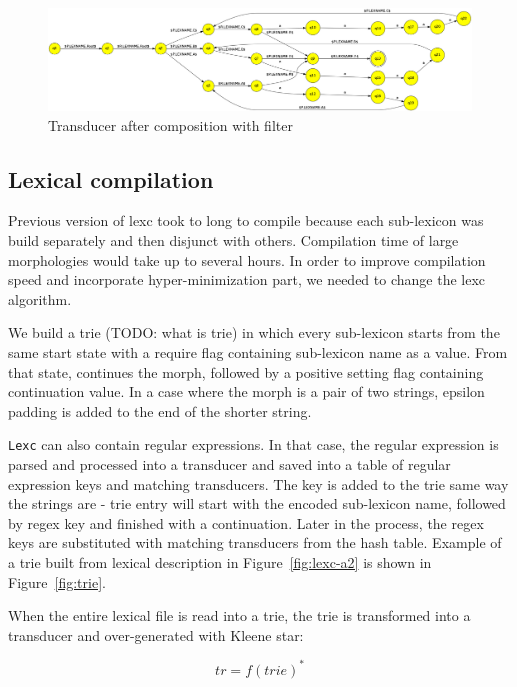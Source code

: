 \documentclass[11pt]{article}
\begin{document}
\begin{figure}
    \includegraphics[width=\textwidth]{after_comp.png}
     \caption{Transducer after composition with filter
     \label{fig:after}}
\end{figure}



\subsection{Lexical compilation}

Previous version of lexc took to long to compile because each sub-lexicon was build separately and then disjunct with others. Compilation time of large morphologies would take up to several hours. In order to improve compilation speed and incorporate hyper-minimization part, we needed to change the lexc algorithm.

We build a trie (TODO: what is trie) in which every sub-lexicon starts from the same start state with a require flag containing sub-lexicon name as a value. From that state, continues the morph, followed by a positive setting flag containing continuation value. In a case where the morph is a pair of two strings, epsilon padding is added to the end of the shorter string.

\texttt{Lexc} can also contain regular expressions. In that case, the regular expression is parsed and processed into a transducer and saved into a table of regular expression keys and matching transducers. The key is added to the trie same way the strings are - trie entry will start with the encoded sub-lexicon name, followed by regex key and finished with a continuation. Later in the process, the regex keys are substituted with matching transducers from the hash table. Example of a trie built from lexical description in Figure~\ref{fig:lexc-a2} is shown in Figure~\ref{fig:trie}.


When the entire lexical file is read into a trie, the trie is transformed into a transducer and over-generated with Kleene star:

\begin{equation}\label{trie_star}
tr = f(trie)^* 
\end{equation}
\end{document}
